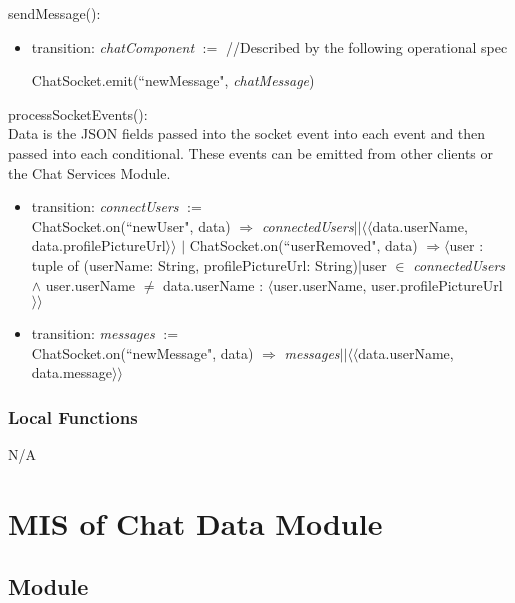 \documentclass[12pt, titlepage]{article}
\begin{document}
	\noindent sendMessage():
	\begin{itemize}
		\item transition: \textit{chatComponent} $:=$ //Described by the following operational spec 
		
		ChatSocket.emit(``newMessage",  \textit{chatMessage})
	\end{itemize}
	
	\noindent processSocketEvents():\\
	
	\noindent Data is the JSON fields passed into the socket event into each event and then passed into each conditional. These events can be emitted from other clients or the Chat Services Module.
	
	\begin{itemize}
		
		\item transition: \textit{connectUsers} $:=$ \\
		ChatSocket.on(``newUser", data) $\Rightarrow$ \textit{connectedUsers}$|| \langle \langle$data.userName, data.profilePictureUrl$\rangle \rangle$ $|$ ChatSocket.on(``userRemoved", data) $\Rightarrow \langle$user : tuple of (userName: String, profilePictureUrl: String)$|$user $\in$ \textit{connectedUsers} $\land$ user.userName $\neq$ data.userName : $\langle$user.userName, user.profilePictureUrl$\rangle\rangle$
		
		\item transition: \textit{messages} $:=$ \\
		ChatSocket.on(``newMessage", data) $\Rightarrow$ \textit{messages}$|| \langle \langle$data.userName, data.message$\rangle \rangle$
	\end{itemize}
	
	\subsubsection{Local Functions}
	
	N/A
	
	\newpage
	
	\section{MIS of Chat Data Module} \label{Module}
	
	\subsection{Module}
	
\end{document}
